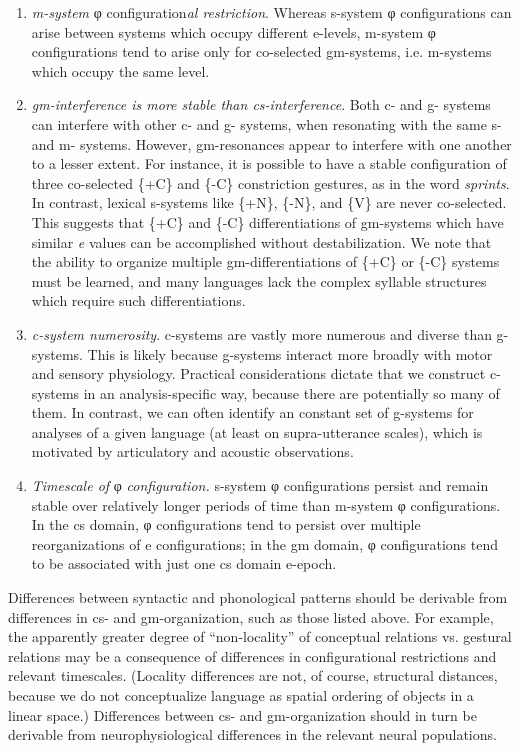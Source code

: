 \begin{enumerate}
\item \textit{m-system} φ configuration\textit{al restriction}. Whereas s-system φ configurations can arise between systems which occupy different e-levels, m-system φ configurations tend to arise only for co-selected gm-systems, i.e. m-systems which occupy the same level. 

\item \textit{gm-interference is more stable than cs-interference}. Both c- and g- systems can interfere with other c- and g- systems, when resonating with the same s- and m- systems. However, gm-resonances appear to interfere with one another to a lesser extent. For instance, it is possible to have a stable configuration of three co-selected \{+C\} and \{-C\} constriction gestures, as in the word \textit{sprints}. In contrast, lexical s-systems like \{+N\}, \{-N\}, and \{V\} are never co-selected. This suggests that \{+C\} and \{-C\} differentiations of gm-systems which have similar \textit{e} values can be accomplished without destabilization. We note that the ability to organize multiple gm-differentiations of \{+C\} or \{-C\} systems must be learned, and many languages lack the complex syllable structures which require such differentiations.

\item \textit{c-system numerosity}. c-systems are vastly more numerous and diverse than g-systems. This is likely because g-systems interact more broadly with motor and sensory physiology. Practical considerations dictate that we construct c-systems in an analysis-specific way, because there are potentially so many of them. In contrast, we can often identify an constant set of g-systems for analyses of a given language (at least on supra-utterance scales), which is motivated  by articulatory and acoustic observations.

\item  \textit{Timescale of} φ \textit{configuration.} s-system φ configurations persist and remain stable over relatively longer periods of time than m-system φ configurations. In the cs domain, φ configurations tend to persist over multiple reorganizations of e configurations; in the gm domain, φ configurations tend to be associated with just one cs domain e-epoch.
\end{enumerate}

  Differences between syntactic and phonological patterns should be derivable from differences in cs- and gm-organization, such as those listed above. For example, the apparently greater degree of “non-locality” of conceptual relations vs. gestural relations may be a consequence of differences in configurational restrictions and relevant timescales. (Locality differences are not, of course, structural distances, because we do not conceptualize language as spatial ordering of objects in a linear space.) Differences between cs- and gm-organization should in turn be derivable from neurophysiological differences in the relevant neural populations.

